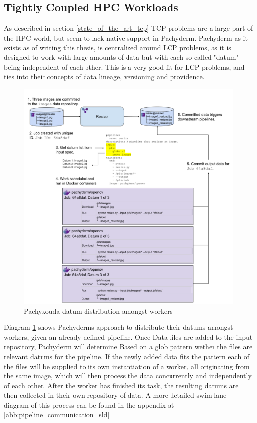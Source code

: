 
\subsection{Tightly Coupled HPC Workloads} 
\label{tcp_hpc_workloads}

As described in section \ref{state_of_the_art_tcp} \ac{TCP} problems are a large part of the \ac{HPC} world,  but seem to lack native support in Pachyderm.
Pachyderm as it exists as of writing this thesis, is centralized around \ac{LCP} problems, as it is designed to work with large amounts of data but with each so called "datum" being independent of each other.
This is a very good fit for \ac{LCP} problems, and ties into their concepts of data lineage, versioning and providence.

\begin{figure}[htb]
    \centering
    \includegraphics[width=14cm]{graphics/datum_distribution_amongst workers.png}
    \caption[Pachykouda datum distribution amongst workers]{Pachykouda datum distribution amongst workers \footnotemark}
    \label{abb:datum_distribution_amongst workers}
\end{figure}


Diagram \ref{abb:datum_distribution_amongst workers} shows Pachyderms approach to distribute their datums amongst workers, given an already defined pipeline.
Once Data files are added to the input repository, Pachyderm will determine Based on a glob pattern wether the files are relevant datums for the pipeline.
If the newly added data fits the pattern each of the files will be supplied to its own instantiation of a worker, all originating from the same image, which will then process the data concurrently and independently of each other.
After the worker has finished its task, the resulting datums are then collected in their own repository of data.
A more detailed swim lane diagram of this process can be found in the appendix at \ref{abb:pipeline_communication_sld}

